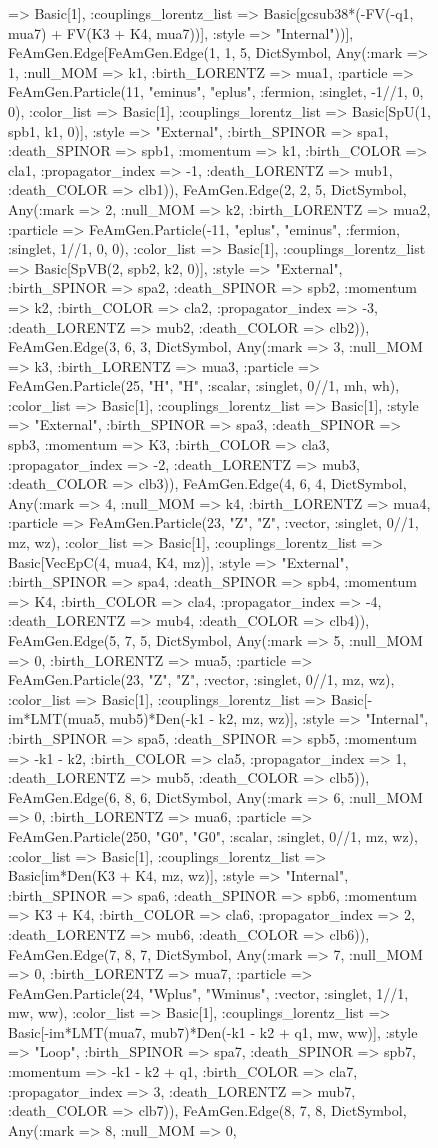 \documentclass{revtex4}
\begin{document}
\begin{figure}[!htb]
\begin{center}
{=> Basic[1], :couplings_lorentz_list => Basic[gcsub38*(-FV(-q1, mua7) + FV(K3 + K4, mua7))], :style => "Internal"))], FeAmGen.Edge[FeAmGen.Edge(1, 1, 5, Dict{Symbol, Any}(:mark => 1, :null_MOM => k1, :birth_LORENTZ => mua1, :particle => FeAmGen.Particle(11, "eminus", "eplus", :fermion, :singlet, -1//1, 0, 0), :color_list => Basic[1], :couplings_lorentz_list => Basic[SpU(1, spb1, k1, 0)], :style => "External", :birth_SPINOR => spa1, :death_SPINOR => spb1, :momentum => k1, :birth_COLOR => cla1, :propagator_index => -1, :death_LORENTZ => mub1, :death_COLOR => clb1)), FeAmGen.Edge(2, 2, 5, Dict{Symbol, Any}(:mark => 2, :null_MOM => k2, :birth_LORENTZ => mua2, :particle => FeAmGen.Particle(-11, "eplus", "eminus", :fermion, :singlet, 1//1, 0, 0), :color_list => Basic[1], :couplings_lorentz_list => Basic[SpVB(2, spb2, k2, 0)], :style => "External", :birth_SPINOR => spa2, :death_SPINOR => spb2, :momentum => k2, :birth_COLOR => cla2, :propagator_index => -3, :death_LORENTZ => mub2, :death_COLOR => clb2)), FeAmGen.Edge(3, 6, 3, Dict{Symbol, Any}(:mark => 3, :null_MOM => k3, :birth_LORENTZ => mua3, :particle => FeAmGen.Particle(25, "H", "H", :scalar, :singlet, 0//1, mh, wh), :color_list => Basic[1], :couplings_lorentz_list => Basic[1], :style => "External", :birth_SPINOR => spa3, :death_SPINOR => spb3, :momentum => K3, :birth_COLOR => cla3, :propagator_index => -2, :death_LORENTZ => mub3, :death_COLOR => clb3)), FeAmGen.Edge(4, 6, 4, Dict{Symbol, Any}(:mark => 4, :null_MOM => k4, :birth_LORENTZ => mua4, :particle => FeAmGen.Particle(23, "Z", "Z", :vector, :singlet, 0//1, mz, wz), :color_list => Basic[1], :couplings_lorentz_list => Basic[VecEpC(4, mua4, K4, mz)], :style => "External", :birth_SPINOR => spa4, :death_SPINOR => spb4, :momentum => K4, :birth_COLOR => cla4, :propagator_index => -4, :death_LORENTZ => mub4, :death_COLOR => clb4)), FeAmGen.Edge(5, 7, 5, Dict{Symbol, Any}(:mark => 5, :null_MOM => 0, :birth_LORENTZ => mua5, :particle => FeAmGen.Particle(23, "Z", "Z", :vector, :singlet, 0//1, mz, wz), :color_list => Basic[1], :couplings_lorentz_list => Basic[-im*LMT(mua5, mub5)*Den(-k1 - k2, mz, wz)], :style => "Internal", :birth_SPINOR => spa5, :death_SPINOR => spb5, :momentum => -k1 - k2, :birth_COLOR => cla5, :propagator_index => 1, :death_LORENTZ => mub5, :death_COLOR => clb5)), FeAmGen.Edge(6, 8, 6, Dict{Symbol, Any}(:mark => 6, :null_MOM => 0, :birth_LORENTZ => mua6, :particle => FeAmGen.Particle(250, "G0", "G0", :scalar, :singlet, 0//1, mz, wz), :color_list => Basic[1], :couplings_lorentz_list => Basic[im*Den(K3 + K4, mz, wz)], :style => "Internal", :birth_SPINOR => spa6, :death_SPINOR => spb6, :momentum => K3 + K4, :birth_COLOR => cla6, :propagator_index => 2, :death_LORENTZ => mub6, :death_COLOR => clb6)), FeAmGen.Edge(7, 8, 7, Dict{Symbol, Any}(:mark => 7, :null_MOM => 0, :birth_LORENTZ => mua7, :particle => FeAmGen.Particle(24, "Wplus", "Wminus", :vector, :singlet, 1//1, mw, ww), :color_list => Basic[1], :couplings_lorentz_list => Basic[-im*LMT(mua7, mub7)*Den(-k1 - k2 + q1, mw, ww)], :style => "Loop", :birth_SPINOR => spa7, :death_SPINOR => spb7, :momentum => -k1 - k2 + q1, :birth_COLOR => cla7, :propagator_index => 3, :death_LORENTZ => mub7, :death_COLOR => clb7)), FeAmGen.Edge(8, 7, 8, Dict{Symbol, Any}(:mark => 8, :null_MOM => 0, }
\end{center}
\end{figure}
\end{document}
